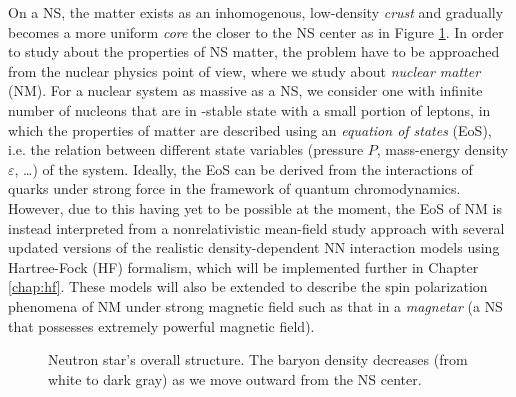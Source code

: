 On a \gls{NS}, the matter exists as an inhomogenous, low-density \emph{crust} and gradually becomes a more uniform \emph{core} the closer to the \gls{NS} center as in Figure \ref{fig:NS_structure}. In order to study about the properties of \gls{NS} matter, the problem have to be approached from the nuclear physics point of view, where we study about \emph{nuclear matter} (\gls{NM}). For a nuclear system as massive as a \gls{NS}, we consider one with infinite number of nucleons that are in \textbeta-stable state with a small portion of leptons, in which the properties of matter are described using an \emph{equation of states} (\gls{EoS}), i.e. the relation between different state variables (pressure $P$, mass-energy density $\varepsilon$, \ldots) of the system. Ideally, the \gls{EoS} can be derived from the interactions of quarks under strong force in the framework of quantum chromodynamics. However, due to this having yet to be possible at the moment, the \gls{EoS} of \gls{NM} is instead interpreted from a nonrelativistic mean-field study approach with several updated versions of the realistic density-dependent \gls{NN} interaction models \citep{tan2021equation} using Hartree-Fock (\gls{HF}) formalism, which will be implemented further in Chapter \ref{chap:hf}. These models will also be extended to describe the spin polarization phenomena of \gls{NM} under strong magnetic field such as that in a \emph{magnetar} (a \gls{NS} that possesses extremely powerful magnetic field).

\begin{figure}[t]
        \centering
        \caption{Neutron star's overall structure. The baryon density decreases (from white to dark gray) as we move outward from the \gls{NS} center.}
        \label{fig:NS_structure}
\end{figure} 

